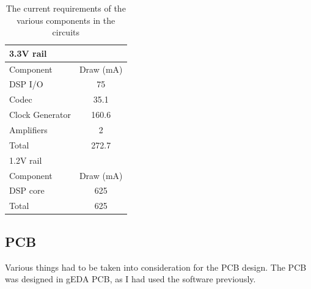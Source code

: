 \begin{table}[H]
	\centering
	\begin{tabular}[c]{| l | c |}
		\hline
		\multicolumn{2}{|l|}{3.3V rail}\\
		\hline
		Component	& Draw (mA)	\\
		\hline
		DSP I/O		& 75	\\
		Codec		& 35.1	\\
		Clock Generator	& 160.6	\\
		Amplifiers	& 2	\\
		\hline
		Total		& 272.7	\\
		\hline
		\hline
		\multicolumn{2}{|l|}{1.2V rail}\\
		\hline
		Component	& Draw (mA)	\\
		\hline
		DSP core	& 625	\\
		\hline
		Total		& 625	\\
		\hline
	\end{tabular}	
	\caption{The current requirements of the various components in the circuits}
	\label{tab:pcbcurrentdraw}
\end{table}

\subsection{PCB}
Various things had to be taken into consideration for the PCB design.
The PCB was designed in gEDA PCB, as I had used the software previously.

